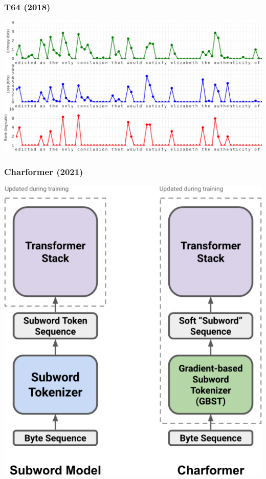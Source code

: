 \documentclass{beamer}
\begin{document}
\begin{frame}
    \frametitle{T64 (2018) \cite{t64}}
    \begin{center}
        \includegraphics[scale=1.0]{img/t64.png}
    \end{center}
\end{frame}

\begin{frame}
    \frametitle{Charformer (2021) \cite{charformer}}
    \begin{center}
        \includegraphics[scale=1.0]{img/gbst.png}
    \end{center}
\end{frame}
\end{document}
